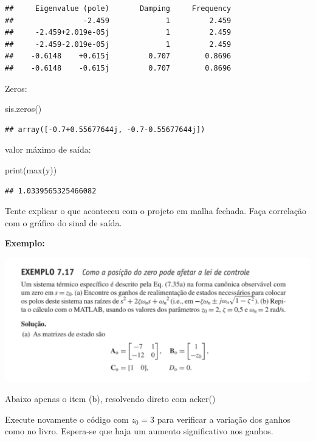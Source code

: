 \documentclass[
]{book}
\newenvironment{Shaded}{\begin{snugshade}}{\end{snugshade}}
\newcommand{\BuiltInTok}[1]{#1}
\newcommand{\NormalTok}[1]{#1}
\begin{document}
\begin{verbatim}
##     Eigenvalue (pole)       Damping     Frequency
##                -2.459             1         2.459
##     -2.459+2.019e-05j             1         2.459
##     -2.459-2.019e-05j             1         2.459
##    -0.6148    +0.615j         0.707        0.8696
##    -0.6148    -0.615j         0.707        0.8696
\end{verbatim}

Zeros:

\begin{Shaded}
\begin{Highlighting}[]
\NormalTok{sis.zeros()}
\end{Highlighting}
\end{Shaded}

\begin{verbatim}
## array([-0.7+0.55677644j, -0.7-0.55677644j])
\end{verbatim}

valor máximo de saída:

\begin{Shaded}
\begin{Highlighting}[]
\BuiltInTok{print}\NormalTok{(}\BuiltInTok{max}\NormalTok{(y))}
\end{Highlighting}
\end{Shaded}

\begin{verbatim}
## 1.0339565325466082
\end{verbatim}

Tente explicar o que aconteceu com o projeto em malha fechada. Faça correlação com o gráfico do sinal de saída.

\textbf{Exemplo:}

\includegraphics[width=1\linewidth]{./figs/Ex7.17}

Abaixo apenas o item (b), resolvendo direto com acker()

Execute novamente o código com \(z_0=3\) para verificar a variação dos
ganhos como no livro. Espera-se que haja um aumento significativo nos
ganhos.
\end{document}
